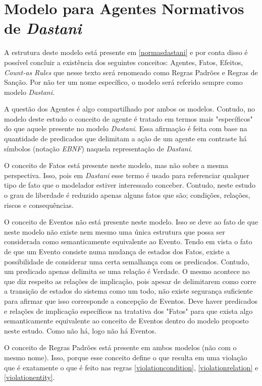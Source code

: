 \section{Modelo para Agentes Normativos de \textit{Dastani}}

A estrutura deste modelo está presente em \ref{normasdastani} e por conta disso é possível concluir a existência dos seguintes conceitos: Agentes,
Fatos, Efeitos, \textit{Count-as Rules} que nesse texto será renomeado como Regras Padrões e Regras de Sanção. Por não ter um nome específico, o
modelo será referido sempre como modelo \textit{Dastani}. 

A questão dos Agentes é algo compartilhado por ambos os modelos. Contudo, no modelo deste estudo o conceito de agente é tratado em termos mais 
"específicos" do que aquele presente no modelo \textit{Dastani}. Essa afirmação é feita com base na quantidade de predicados que delimitam a ação 
de um agente em contraste há símbolos (notação \textit{EBNF}) naquela representação de \textit{Dastani}. 

O conceito de Fatos está presente neste modelo, mas não sobre a mesma perspectiva. Isso, pois em \textit{Dastani} esse termo é usado para referenciar 
qualquer tipo de fato que o modelador estiver interessado conceber. Contudo, neste estudo o grau de liberdade é reduzido apenas alguns fatos que são; 
condições, relações, riscos e consequências.

O conceito de Eventos não está presente neste modelo. Isso se deve ao fato de que neste modelo não existe nem mesmo uma única estrutura que possa ser 
considerada como semanticamente equivalente ao Evento. Tendo em vista o fato de que um Evento consiste numa mudança de estados dos Fatos, existe a possibilidade
de considerar uma certa semalhança com os predicados. Contudo, um predicado apenas delimita se uma relação é Verdade. O mesmo acontece no que diz respeito 
as relações de implicação, pois apesar de delimitarem como corre a transição de estados do sistema como um todo, não existe segurança suficiente 
para afirmar que isso corresponde a concepção de Eventos. Deve haver predicados e relações de implicação específicos na tratativa dos "Fatos" para que 
exista algo semanticamente equivalente ao conceito de Eventos dentro do modelo proposto neste estudo. Como não há, logo não há Eventos. 

O conceito de Regras Padrões está presente em ambos modelos (não com o mesmo nome). Isso, porque esse conceito define o que resulta em uma violação que é 
exatamente o que é feito nas regras \ref{violationcondition}, \ref{violationrelation} e \ref{violationentity}.

